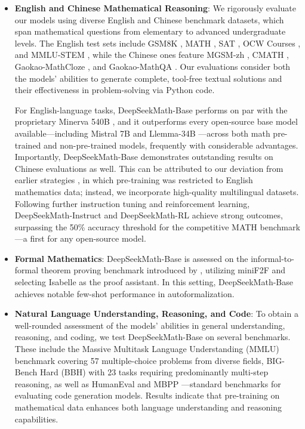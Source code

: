 \begin{itemize}[topsep=0pt]
    \item \textbf{English and Chinese Mathematical Reasoning}: We rigorously evaluate our models using diverse English and Chinese benchmark datasets, which span mathematical questions from elementary to advanced undergraduate levels. The English test sets include GSM8K \citep{gsm8k}, MATH \citep{MATH}, SAT \citep{llemma}, OCW Courses \citep{minerva}, and MMLU-STEM \citep{mmlu}, while the Chinese ones feature MGSM-zh \citep{mgsm}, CMATH \citep{wei2023cmath}, Gaokao-MathCloze \citep{agieval}, and Gaokao-MathQA \citep{agieval}. Our evaluations consider both the models’ abilities to generate complete, tool-free textual solutions and their effectiveness in problem-solving via Python code.
    
    For English-language tasks, DeepSeekMath-Base performs on par with the proprietary Minerva 540B \citep{minerva}, and it outperforms every open-source base model available—including Mistral 7B \citep{mistral} and Llemma-34B \citep{llemma}—across both math pre-trained and non-pre-trained models, frequently with considerable advantages. Importantly, DeepSeekMath-Base demonstrates outstanding results on Chinese evaluations as well. This can be attributed to our deviation from earlier strategies \citep{minerva,llemma}, in which pre-training was restricted to English mathematics data; instead, we incorporate high-quality multilingual datasets. Following further instruction tuning and reinforcement learning, DeepSeekMath-Instruct and DeepSeekMath-RL achieve strong outcomes, surpassing the 50\% accuracy threshold for the competitive MATH benchmark—a first for any open-source model.

\item \textbf{Formal Mathematics}: DeepSeekMath-Base is assessed on the informal-to-formal theorem proving benchmark introduced by \citep{dsp_proof}, utilizing miniF2F \citep{minif2f} and selecting Isabelle \citep{isabelle} as the proof assistant. In this setting, DeepSeekMath-Base achieves notable few-shot performance in autoformalization.
\item \textbf{Natural Language Understanding, Reasoning, and Code}: To obtain a well-rounded assessment of the models’ abilities in general understanding, reasoning, and coding, we test DeepSeekMath-Base on several benchmarks. These include the Massive Multitask Language Understanding (MMLU) benchmark \citep{mmlu} covering 57 multiple-choice problems from diverse fields, BIG-Bench Hard (BBH) \citep{bbh} with 23 tasks requiring predominantly multi-step reasoning, as well as HumanEval \citep{codex} and MBPP \citep{mbpp}—standard benchmarks for evaluating code generation models. Results indicate that pre-training on mathematical data enhances both language understanding and reasoning capabilities.


\end{itemize}
